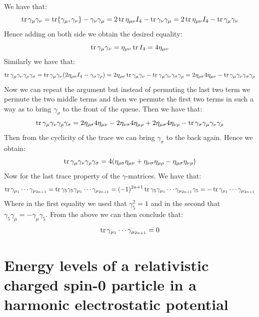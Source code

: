 \documentclass[10pt,a4paper]{article}
\begin{document}
We have that:
\[
\tr \gamma_\mu \gamma_\nu = \tr {\gamma_\mu, \gamma_\nu} - \gamma_\nu \gamma_\mu = 2 \tr \eta_{\mu \nu} I_4 - \tr \gamma_\nu \gamma_\mu = 2 \tr \eta_{\mu \nu} I_4 - \tr \gamma_\mu \gamma_\nu
\]
Hence adding on both side we obtain the desired equality:
\[
\tr \gamma_\mu \gamma_\nu = \eta_{\mu \nu} \tr I_4 = 4 \eta_{\mu \nu}
\]
Similarly we have that:
\[
\tr \gamma_\mu \gamma_\nu \gamma_\rho \gamma_\sigma = \tr \gamma_\mu \gamma_\nu (2\eta_{\rho \sigma} I_4 - \gamma_\sigma \gamma_\rho) = 2\eta_{\rho \sigma} \tr \gamma_\mu \gamma_\nu - \tr \gamma_\mu \gamma_\nu \gamma_\sigma \gamma_\rho = 2 \eta_{\rho \sigma} 4 \eta_{\mu \nu} - \tr \gamma_\mu \gamma_\nu \gamma_\sigma \gamma_\rho 
\]
Now we can repeat the argument but instead of permuting the last two term we permute the two middle terms and then we permute the first two terms in such a way as to bring $\gamma_\sigma$ to the front of the queue. Then we have that:
\[
\tr \gamma_\mu \gamma_\nu \gamma_\rho \gamma_\sigma = 2 \eta_{\rho \sigma} 4 \eta_{\mu \nu} -  2 \eta_{\nu \sigma} 4 \eta_{\mu \rho} + 2 \eta_{\mu \sigma} 4 \eta_{\nu \rho} - \tr \gamma_\sigma \gamma_\mu \gamma_\nu \gamma_\rho
\]
Then from the cyclicity of the trace we can bring $\gamma_\sigma$ to the back again. Hence we obtain:
\[
\tr \gamma_\mu \gamma_\nu \gamma_\rho \gamma_\sigma = 4(\eta_{\rho \sigma} \eta_{\mu \nu} + \eta_{\nu \sigma} \eta_{\mu \rho} - \eta_{\mu \sigma} \eta_{\nu \rho})
\]
Now for the last trace property of the $\gamma$-matrices. We have that:
\[
\tr \gamma_{\mu_1} \cdots \gamma_{\mu_{2n+1}} = \tr \gamma_5 \gamma_5 \gamma_{\mu_1} \cdots \gamma_{\mu_{2n+1}} = (-1)^{2n+1}\tr \gamma_5 \gamma_{\mu_1}\cdots \gamma_{\mu_{2n + 1}} \gamma_5 = - \tr \gamma_{\mu_1} \cdots \gamma_{\mu_{2n + 1}}
\]
Where in the first equality we used that $\gamma_5^2 = 1$ and in the second that $\gamma_5 \gamma_\mu = - \gamma_\mu \gamma_5$. From the above we can then conclude that:
\[
\tr \gamma_{\mu_1} \cdots \gamma_{\mu_{2n+1}} = 0
\]

\section{Energy levels of a relativistic charged spin-0 particle in a harmonic electrostatic potential}
\end{document}
